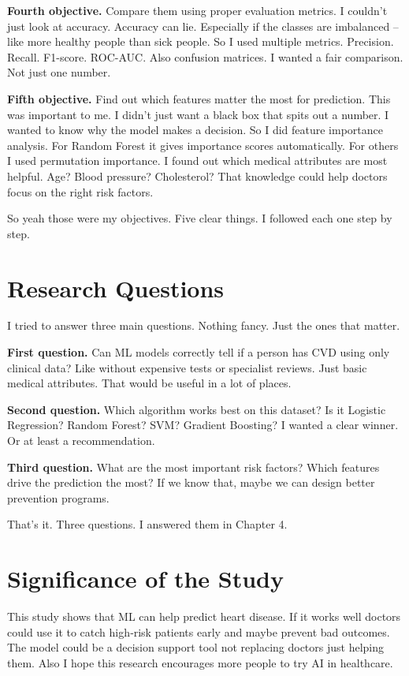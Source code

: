 \documentclass[11pt, a4paper, oneside]{book}
\begin{document}
\textbf{Fourth objective.} Compare them using proper evaluation metrics. I couldn't just look at accuracy. Accuracy can lie. Especially if the classes are imbalanced – like more healthy people than sick people. So I used multiple metrics. Precision. Recall. F1-score. ROC-AUC. Also confusion matrices. I wanted a fair comparison. Not just one number.

\textbf{Fifth objective.} Find out which features matter the most for prediction. This was important to me. I didn't just want a black box that spits out a number. I wanted to know why the model makes a decision. So I did feature importance analysis. For Random Forest it gives importance scores automatically. For others I used permutation importance. I found out which medical attributes are most helpful. Age? Blood pressure? Cholesterol? That knowledge could help doctors focus on the right risk factors.

So yeah those were my objectives. Five clear things. I followed each one step by step.

\section{Research Questions}

I tried to answer three main questions. Nothing fancy. Just the ones that matter.

\textbf{First question.} Can ML models correctly tell if a person has CVD using only clinical data? Like without expensive tests or specialist reviews. Just basic medical attributes. That would be useful in a lot of places.

\textbf{Second question.} Which algorithm works best on this dataset? Is it Logistic Regression? Random Forest? SVM? Gradient Boosting? I wanted a clear winner. Or at least a recommendation.

\textbf{Third question.} What are the most important risk factors? Which features drive the prediction the most? If we know that, maybe we can design better prevention programs.

That's it. Three questions. I answered them in Chapter 4.

\section{Significance of the Study}
This study shows that ML can help predict heart disease. If it works well doctors could use it to catch high‑risk patients early and maybe prevent bad outcomes. The model could be a decision support tool not replacing doctors just helping them. Also I hope this research encourages more people to try AI in healthcare.
\end{document}
